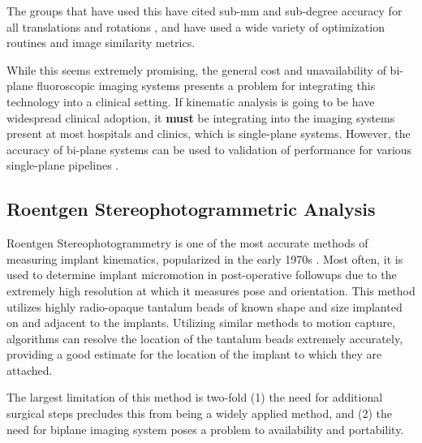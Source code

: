 The groups that have used this have cited sub-mm and sub-degree accuracy for all translations and rotations \cite{burtonAutomaticTrackingHealthy2021,youVivoMeasurement3D2001,bakaStatisticalShapeModelBased2012}, and have used a wide variety of optimization routines and image similarity metrics. 

While this seems extremely promising, the general cost and unavailability of bi-plane fluoroscopic imaging systems presents a problem for integrating this technology into a clinical setting. If kinematic analysis is going to be have widespread clinical adoption, it \textbf{must} be integrating into the imaging systems present at most hospitals and clinics, which is single-plane systems. However, the accuracy of bi-plane systems can be used to validation of performance for various single-plane pipelines \cite{brobergValidationMachineLearning2023}.

\subsection{Roentgen Stereophotogrammetric Analysis}

Roentgen Stereophotogrammetry is one of the most accurate methods of measuring implant kinematics, popularized in the early 1970s \cite{selvikRoentgenStereophotogrammetryMethod1989}. Most often, it is used to determine implant micromotion in post-operative followups due to the extremely high resolution at which it measures pose and orientation. This method utilizes highly radio-opaque tantalum beads of known shape and size implanted on and adjacent to the implants. Utilizing similar methods to motion capture, algorithms can resolve the location of the tantalum beads extremely accurately, providing a good estimate for the location of the implant to which they are attached.

The largest limitation of this method is two-fold (1) the need for additional surgical steps precludes this from being a widely applied method, and (2) the need for biplane imaging system poses a problem to availability and portability.